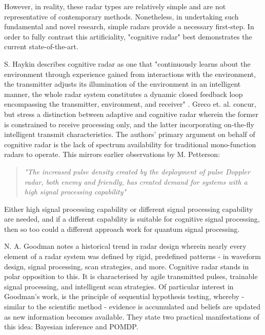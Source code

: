 However, in reality, these radar types are relatively simple and are not representative of contemporary methods.
Nonetheless, in undertaking such fundamental and novel research, simple radars provide a necessary first-step.
In order to fully contrast this artificiality, "cognitive radar" best demonstrates the current state-of-the-art.

S. Haykin describes cognitive radar as one that "continuously learns about the environment through experience gained from interactions with the environment, the transmitter adjusts its illumination of the environment in an intelligent manner, the whole radar system constitutes a dynamic closed feedback loop encompassing the transmitter, environment, and receiver" \cite{haykin_cognitive_2006}.
Greco et. al. \cite{greco_cognitive_nodate} concur, but stress a distinction between adaptive and cognitive radar wherein the former is constrained to receive processing only, and the latter incorporating on-the-fly intelligent transmit characteristics.
The authors' primary argument on behalf of cognitive radar is the lack of spectrum availability for traditional mono-function radars to operate.
This mirrors earlier observations by M. Petterson:
\begin{quote}
    \textit{"The increased pulse density created by the deployment of pulse Doppler radar, both enemy and friendly, has created demand for systems with a high signal processing capability"}  \cite[p. 42]{pettersson_illustrated_1992}
\end{quote}
Either high signal processing capability or different signal processing capability are needed, and if a different capability is suitable for cognitive signal processing, then so too could a different approach work for quantum signal processing.


N. A. Goodman \cite{goodman_chapter_2018} notes a historical trend in radar design wherein nearly every element of a radar system was defined by rigid, predefined patterns - in waveform design, signal processing, scan strategies, and more.
Cognitive radar stands in polar opposition to this.
It is characterised by agile transmitted pulses, trainable signal processing, and intelligent scan strategies. 
Of particular interest in Goodman's work, is the principle of sequential hypothesis testing, whereby - similar to the scientific method - evidence is accumulated and beliefs are updated as new information becomes available.
They state two practical manifestations of this idea: Bayesian inference and \ac{POMDP}.

